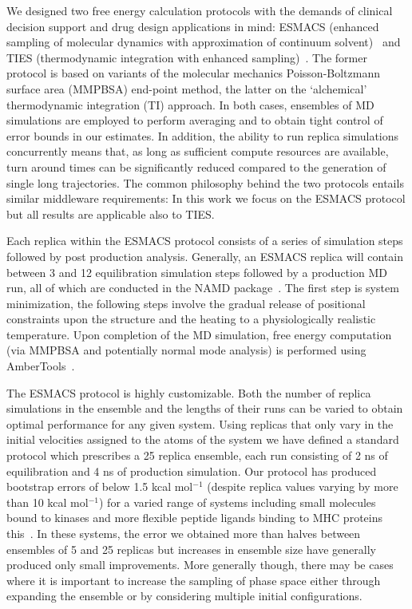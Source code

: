 We designed two free energy calculation protocols with the demands of
clinical decision support and drug design applications in mind: ESMACS
(enhanced sampling of molecular dynamics with approximation of continuum
solvent)~\cite{Wan2017brd4} and TIES (thermodynamic integration with enhanced
sampling)~\cite{Bhati2017}. The former protocol is based on variants of the
molecular mechanics Poisson-Boltzmann surface area (MMPBSA) end-point method,
the latter on the `alchemical' thermodynamic integration (TI) approach. In
both cases, ensembles of MD simulations are employed to perform averaging and
to obtain tight control of error bounds in our estimates. In addition, the
ability to run replica simulations concurrently means that, as long as
sufficient compute resources are available, turn around times can be
significantly reduced compared to the generation of single long trajectories.
The common philosophy behind the two protocols entails similar middleware
requirements: %
In this work we focus on the ESMACS protocol but all results are applicable
also to TIES.

Each replica within the ESMACS protocol consists of a series of simulation
steps followed by post production analysis. Generally, an ESMACS replica will
contain between 3 and 12 equilibration simulation steps followed by a
production MD run, all of which are conducted in the NAMD
package~\cite{Phillips2005}. The first step is system minimization, the
following steps involve the gradual release of positional constraints upon
the structure and the heating to a physiologically realistic temperature.
Upon completion of the MD simulation, free energy computation (via MMPBSA and
potentially normal mode analysis) is performed using
AmberTools~\cite{amber14, Case2005, MillerIII2012}.

The ESMACS protocol is highly customizable. Both the number of replica
simulations in the ensemble and the lengths of their runs can be varied to
obtain optimal performance for any given system. Using replicas that only
vary in the initial velocities assigned to the atoms of the system we have
defined a standard protocol which prescribes a 25 replica ensemble, each run
consisting of 2 ns of equilibration and 4 ns of production simulation. Our
protocol has produced bootstrap errors of below 1.5 kcal mol$^{-1}$ (despite
replica values varying by more than 10 kcal mol$^{-1}$) for a varied range of
systems including small molecules bound to kinases and more flexible peptide
ligands binding to MHC proteins this~\cite{Wan2015, Wright2014, Wan2017brd4}.
In these systems, the error we obtained more than halves between ensembles of
5 and 25 replicas but increases in ensemble size have generally produced only
small improvements. More generally though, there may be cases where it is
important to increase the sampling of phase space either through expanding
the ensemble or by considering multiple initial configurations.

